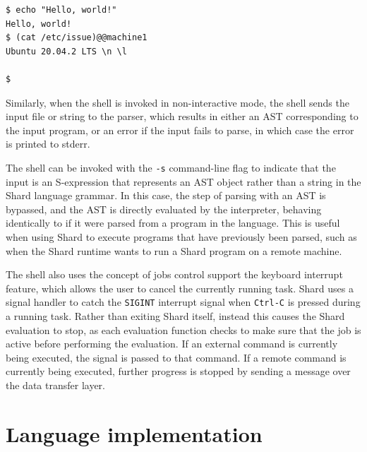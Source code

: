 \documentclass[oneside]{report}
\begin{document}
\begin{minipage}[c]{\textwidth-15pt}
  \begin{lstlisting}[language=Shard]
$ echo "Hello, world!"
Hello, world!
$ (cat /etc/issue)@@machine1
Ubuntu 20.04.2 LTS \n \l

$
\end{lstlisting}
  \smallskip
\end{minipage}

Similarly, when the shell is invoked in non-interactive mode, the shell sends the input file or string to the parser, which results in either an AST corresponding to the input program, or an error if the input fails to parse, in which case the error is printed to stderr.

The shell can be invoked with the \texttt{-s} command-line flag to indicate that the input is an S-expression that represents an AST object rather than a string in the Shard language grammar. In this case, the step of parsing with an AST is bypassed, and the AST is directly evaluated by the interpreter, behaving identically to if it were parsed from a program in the language.
This is useful when using Shard to execute programs that have previously been parsed, such as when the Shard runtime wants to run a Shard program on a remote machine.

The shell also uses the concept of jobs control support the keyboard interrupt feature, which allows the user to cancel the currently running task.
Shard uses a signal handler to catch the \texttt{SIGINT} interrupt signal when \texttt{Ctrl-C} is pressed during a running task.
Rather than exiting Shard itself, instead this causes the Shard evaluation to stop, as each evaluation function checks to make sure that the job is active before performing the evaluation.
If an external command is currently being executed, the signal is passed to that command. If a remote command is currently being executed, further progress is stopped by sending a message over the data transfer layer.

\section{Language implementation}

\end{document}
